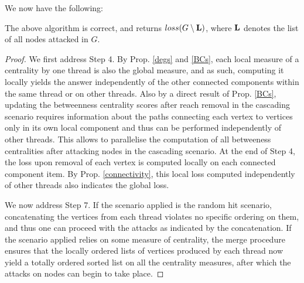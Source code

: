 We now have the following:
\begin{proposition}
The above algorithm is correct, and returns $loss(G\setminus {\bf L})$, where ${\bf L}$ denotes the list of all nodes attacked in $G$.
\end{proposition}
\begin{proof}
We first address Step 4. By Prop. \ref{degs} and \ref{BCs}, each local measure of a centrality by one thread is also the global measure, and as such, computing it locally yields the answer independently of the other connected components within the same thread or on other threads. Also by a direct result of Prop. \ref{BCs}, updating the betweenness centrality scores after reach removal in the cascading scenario requires information about the paths connecting each vertex to vertices only in its own local component and thus can be performed independently of other threads. This allows to parallelise the computation of all betweeness centralities after attacking nodes in the cascading scenario. At the end of Step 4, the loss upon removal of each vertex is computed locally on each connected component item. By Prop. \ref{connectivity}, this local loss computed independently of other threads also indicates the global loss. 

We now address Step 7. If the scenario applied is the random hit scenario, concatenating the vertices from each thread violates no specific ordering on them, and thus one can proceed with the attacks as indicated by the concatenation. If the scenario applied relies on some measure of centrality, the merge procedure ensures that the locally ordered lists of vertices produced by each thread now yield a totally ordered sorted list on all the centrality measures, after which the attacks on nodes can begin to take place.


\end{proof}
